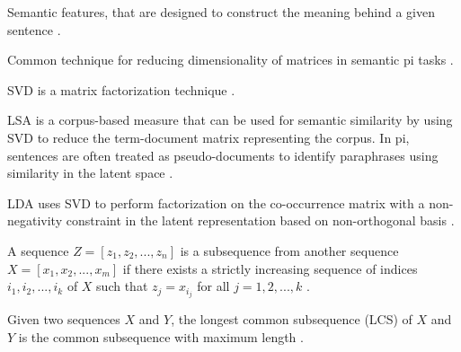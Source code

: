 \begin{definition}
    Semantic features, that are designed to construct the meaning behind a given sentence \cite{zhou_paraphrase_2025}.
\end{definition}

\begin{definition}
    Common technique for reducing dimensionality of matrices in semantic \ac{pi} tasks \cite{zhou_paraphrase_2025}.
\end{definition}

\begin{definition}
    SVD is a matrix factorization technique \cite{zhou_paraphrase_2025}.
\end{definition}

\begin{definition}
    LSA is a corpus-based measure that can be used for semantic similarity by using SVD to reduce the term-document matrix representing the corpus.
    In \ac{pi}, sentences are often treated as pseudo-documents to identify paraphrases using similarity in the latent space \cite{zhou_paraphrase_2025}.
\end{definition}

\begin{definition}
    LDA uses SVD to perform factorization on the co-occurrence matrix with a non-negativity constraint in the latent representation based on non-orthogonal basis \cite{zhou_paraphrase_2025}.
\end{definition}

\begin{definition}
    [Subsequence]
    A sequence $Z=[z_1, z_2, ..., z_n]$ is a subsequence from another sequence $X=[x_1, x_2, ..., x_m]$ if there exists a strictly increasing sequence of indices $i_1, i_2, ..., i_k$ of $X$ such that $z_j = x_{i_j}$ for all $j=1, 2, ..., k$ \cite{lin_rouge_2004}.
\end{definition}

\begin{definition}
    Given two sequences $X$ and $Y$, the longest common subsequence (LCS) of $X$ and $Y$ is the common subsequence with maximum length \cite{lin_rouge_2004}.
\end{definition}